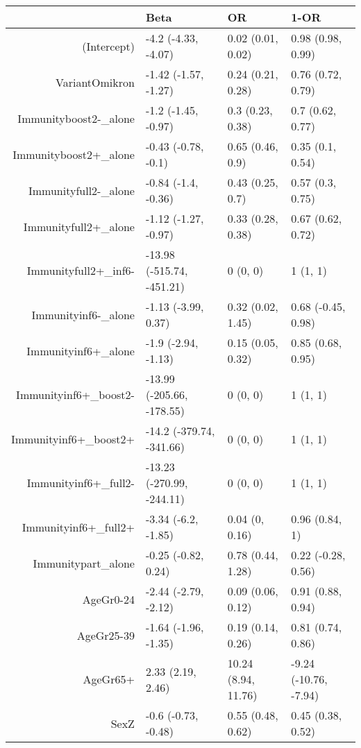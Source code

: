 \begin{table}[ht]
\centering
\begin{tabular}{rlll}
  \hline
 & Beta & OR & 1-OR \\ 
  \hline
(Intercept) & -4.2 (-4.33, -4.07) & 0.02 (0.01, 0.02) & 0.98 (0.98, 0.99) \\ 
  VariantOmikron & -1.42 (-1.57, -1.27) & 0.24 (0.21, 0.28) & 0.76 (0.72, 0.79) \\ 
  Immunityboost2-\_alone & -1.2 (-1.45, -0.97) & 0.3 (0.23, 0.38) & 0.7 (0.62, 0.77) \\ 
  Immunityboost2+\_alone & -0.43 (-0.78, -0.1) & 0.65 (0.46, 0.9) & 0.35 (0.1, 0.54) \\ 
  Immunityfull2-\_alone & -0.84 (-1.4, -0.36) & 0.43 (0.25, 0.7) & 0.57 (0.3, 0.75) \\ 
  Immunityfull2+\_alone & -1.12 (-1.27, -0.97) & 0.33 (0.28, 0.38) & 0.67 (0.62, 0.72) \\ 
  Immunityfull2+\_inf6- & -13.98 (-515.74, -451.21) & 0 (0, 0) & 1 (1, 1) \\ 
  Immunityinf6-\_alone & -1.13 (-3.99, 0.37) & 0.32 (0.02, 1.45) & 0.68 (-0.45, 0.98) \\ 
  Immunityinf6+\_alone & -1.9 (-2.94, -1.13) & 0.15 (0.05, 0.32) & 0.85 (0.68, 0.95) \\ 
  Immunityinf6+\_boost2- & -13.99 (-205.66, -178.55) & 0 (0, 0) & 1 (1, 1) \\ 
  Immunityinf6+\_boost2+ & -14.2 (-379.74, -341.66) & 0 (0, 0) & 1 (1, 1) \\ 
  Immunityinf6+\_full2- & -13.23 (-270.99, -244.11) & 0 (0, 0) & 1 (1, 1) \\ 
  Immunityinf6+\_full2+ & -3.34 (-6.2, -1.85) & 0.04 (0, 0.16) & 0.96 (0.84, 1) \\ 
  Immunitypart\_alone & -0.25 (-0.82, 0.24) & 0.78 (0.44, 1.28) & 0.22 (-0.28, 0.56) \\ 
  AgeGr0-24 & -2.44 (-2.79, -2.12) & 0.09 (0.06, 0.12) & 0.91 (0.88, 0.94) \\ 
  AgeGr25-39 & -1.64 (-1.96, -1.35) & 0.19 (0.14, 0.26) & 0.81 (0.74, 0.86) \\ 
  AgeGr65+ & 2.33 (2.19, 2.46) & 10.24 (8.94, 11.76) & -9.24 (-10.76, -7.94) \\ 
  SexZ & -0.6 (-0.73, -0.48) & 0.55 (0.48, 0.62) & 0.45 (0.38, 0.52) \\ 
   \hline
\end{tabular}
\end{table}
